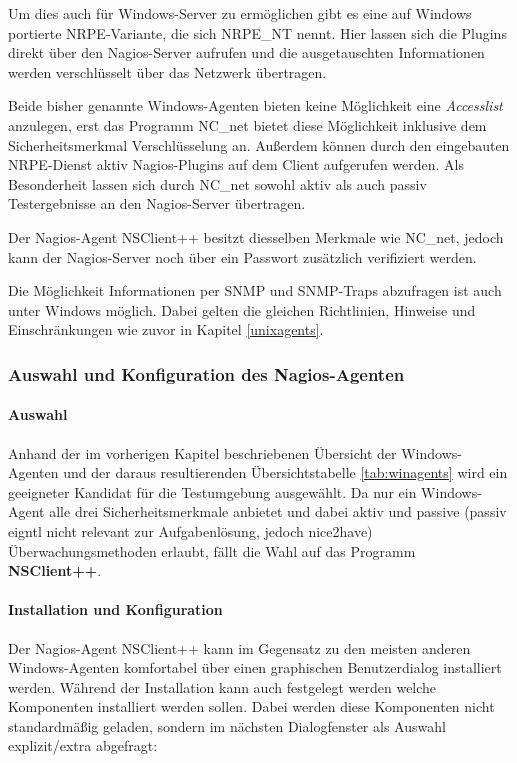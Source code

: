 Um dies auch für Windows-Server zu ermöglichen gibt es eine auf Windows portierte \gls{NRPE}-Variante, die sich NRPE\_NT nennt.
Hier lassen sich die Plugins direkt über den Nagios-Server aufrufen und die ausgetauschten Informationen werden verschlüsselt über das Netzwerk übertragen.

Beide bisher genannte Windows-Agenten bieten keine Möglichkeit eine \textit{Accesslist} anzulegen, erst das Programm NC\_net bietet diese Möglichkeit inklusive dem Sicherheitsmerkmal Verschlüsselung an.
Außerdem können durch den eingebauten \gls{NRPE}-Dienst aktiv Nagios-Plugins auf dem Client aufgerufen werden.
Als Besonderheit lassen sich durch NC\_net sowohl aktiv als auch passiv Testergebnisse an den Nagios-Server übertragen. 

Der Nagios-Agent NSClient++ besitzt diesselben Merkmale wie NC\_net, jedoch kann der Nagios-Server noch über ein Passwort zusätzlich verifiziert werden.

Die Möglichkeit Informationen per \gls{SNMP} und \gls{SNMP}-Traps abzufragen ist auch unter Windows möglich.
Dabei gelten die gleichen Richtlinien, Hinweise und Einschränkungen wie zuvor in Kapitel \ref{unixagents}.

\subsubsection{Auswahl und Konfiguration des Nagios-Agenten}

\paragraph{Auswahl}
Anhand der im vorherigen Kapitel beschriebenen Übersicht der Windows-Agenten und der daraus resultierenden Übersichtstabelle \ref{tab:winagents} wird ein geeigneter Kandidat für die Testumgebung ausgewählt.
Da nur ein Windows-Agent alle drei Sicherheitsmerkmale anbietet und dabei aktiv und passive (passiv eigntl nicht relevant zur Aufgabenlösung, jedoch nice2have) Überwachungsmethoden erlaubt, fällt die Wahl auf das Programm \textbf{NSClient++}.

\paragraph{Installation und Konfiguration}

Der Nagios-Agent NSClient++ kann im Gegensatz zu den meisten anderen Windows-Agenten komfortabel über einen graphischen Benutzerdialog installiert werden.
Während der Installation kann auch festgelegt werden welche Komponenten installiert werden sollen.
Dabei werden diese Komponenten nicht standardmäßig geladen, sondern im nächsten Dialogfenster als Auswahl explizit/extra abgefragt:

